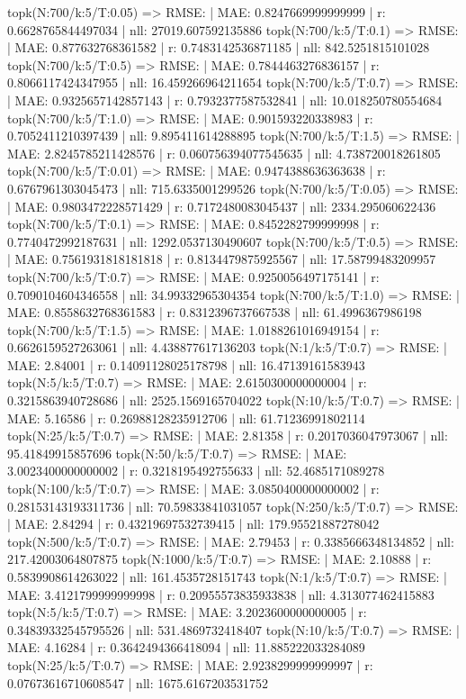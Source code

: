 topk(N:700/k:5/T:0.05) => RMSE: | MAE: 0.8247669999999999 | r: 0.6628765844497034 | nll: 27019.607592135886
topk(N:700/k:5/T:0.1) => RMSE: | MAE: 0.877632768361582 | r: 0.7483142536871185 | nll: 842.5251815101028
topk(N:700/k:5/T:0.5) => RMSE: | MAE: 0.7844463276836157 | r: 0.8066117424347955 | nll: 16.459266964211654
topk(N:700/k:5/T:0.7) => RMSE: | MAE: 0.9325657142857143 | r: 0.7932377587532841 | nll: 10.018250780554684
topk(N:700/k:5/T:1.0) => RMSE: | MAE: 0.901593220338983 | r: 0.7052411210397439 | nll: 9.895411614288895
topk(N:700/k:5/T:1.5) => RMSE: | MAE: 2.8245785211428576 | r: 0.060756394077545635 | nll: 4.738720018261805
topk(N:700/k:5/T:0.01) => RMSE: | MAE: 0.9474388636363638 | r: 0.6767961303045473 | nll: 715.6335001299526
topk(N:700/k:5/T:0.05) => RMSE: | MAE: 0.9803472228571429 | r: 0.7172480083045437 | nll: 2334.295060622436
topk(N:700/k:5/T:0.1) => RMSE: | MAE: 0.8452282799999998 | r: 0.7740472992187631 | nll: 1292.0537130490607
topk(N:700/k:5/T:0.5) => RMSE: | MAE: 0.7561931818181818 | r: 0.8134479875925567 | nll: 17.58799483209957
topk(N:700/k:5/T:0.7) => RMSE: | MAE: 0.9250056497175141 | r: 0.7090104604346558 | nll: 34.99332965304354
topk(N:700/k:5/T:1.0) => RMSE: | MAE: 0.8558632768361583 | r: 0.8312396737667538 | nll: 61.4996367986198
topk(N:700/k:5/T:1.5) => RMSE: | MAE: 1.0188261016949154 | r: 0.6626159527263061 | nll: 4.438877617136203
topk(N:1/k:5/T:0.7) => RMSE: | MAE: 2.84001 | r: 0.14091128025178798 | nll: 16.47139161583943
topk(N:5/k:5/T:0.7) => RMSE: | MAE: 2.6150300000000004 | r: 0.3215863940728686 | nll: 2525.1569165704022
topk(N:10/k:5/T:0.7) => RMSE: | MAE: 5.16586 | r: 0.26988128235912706 | nll: 61.71236991802114
topk(N:25/k:5/T:0.7) => RMSE: | MAE: 2.81358 | r: 0.2017036047973067 | nll: 95.41849915857696
topk(N:50/k:5/T:0.7) => RMSE: | MAE: 3.0023400000000002 | r: 0.3218195492755633 | nll: 52.4685171089278
topk(N:100/k:5/T:0.7) => RMSE: | MAE: 3.0850400000000002 | r: 0.28153143193311736 | nll: 70.59833841031057
topk(N:250/k:5/T:0.7) => RMSE: | MAE: 2.84294 | r: 0.43219697532739415 | nll: 179.95521887278042
topk(N:500/k:5/T:0.7) => RMSE: | MAE: 2.79453 | r: 0.3385666348134852 | nll: 217.42003064807875
topk(N:1000/k:5/T:0.7) => RMSE: | MAE: 2.10888 | r: 0.5839908614263022 | nll: 161.4535728151743
topk(N:1/k:5/T:0.7) => RMSE: | MAE: 3.4121799999999998 | r: 0.20955573835933838 | nll: 4.313077462415883
topk(N:5/k:5/T:0.7) => RMSE: | MAE: 3.2023600000000005 | r: 0.34839332545795526 | nll: 531.4869732418407
topk(N:10/k:5/T:0.7) => RMSE: | MAE: 4.16284 | r: 0.3642494366418094 | nll: 11.885222033284089
topk(N:25/k:5/T:0.7) => RMSE: | MAE: 2.9238299999999997 | r: 0.07673616710608547 | nll: 1675.6167203531752
